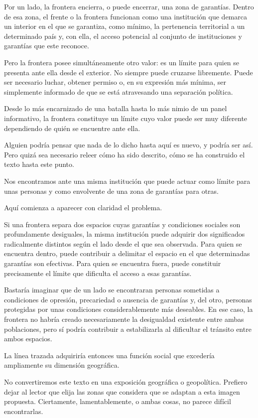 \documentclass[12pt,a4paper]{article}
\begin{document}
Por un lado, la frontera encierra, o puede encerrar, una zona de garantías. Dentro de esa zona, el frente o la frontera funcionan como una institución que demarca un interior en el que se garantiza, como mínimo, la pertenencia territorial a un determinado país y, con ella, el acceso potencial al conjunto de instituciones y garantías que este reconoce.

Pero la frontera posee simultáneamente otro valor: es un límite para quien se presenta ante ella desde el exterior. No siempre puede cruzarse libremente. Puede ser necesario luchar, obtener permiso o, en su expresión más mínima, ser simplemente informado de que se está atravesando una separación política.

Desde lo más encarnizado de una batalla hasta lo más nimio de un panel informativo, la frontera constituye un límite cuyo valor puede ser muy diferente dependiendo de quién se encuentre ante ella.

Alguien podría pensar que nada de lo dicho hasta aquí es nuevo, y podría ser así. Pero quizá sea necesario releer cómo ha sido descrito, cómo se ha construido el texto hasta este punto.

Nos encontramos ante una misma institución que puede actuar como límite para unas personas y como envolvente de una zona de garantías para otras.

Aquí comienza a aparecer con claridad el problema.

Si una frontera separa dos espacios cuyas garantías y condiciones sociales son profundamente desiguales, la misma institución puede adquirir dos significados radicalmente distintos según el lado desde el que sea observada. Para quien se encuentra dentro, puede contribuir a delimitar el espacio en el que determinadas garantías son efectivas. Para quien se encuentra fuera, puede constituir precisamente el límite que dificulta el acceso a esas garantías.

Bastaría imaginar que de un lado se encontraran personas sometidas a condiciones de opresión, precariedad o ausencia de garantías y, del otro, personas protegidas por unas condiciones considerablemente más deseables. En ese caso, la frontera no habría creado necesariamente la desigualdad existente entre ambas poblaciones, pero sí podría contribuir a estabilizarla al dificultar el tránsito entre ambos espacios.

La línea trazada adquiriría entonces una función social que excedería ampliamente su dimensión geográfica.

No convertiremos este texto en una exposición geográfica o geopolítica. Prefiero dejar al lector que elija las zonas que considera que se adaptan a esta imagen propuesta. Ciertamente, lamentablemente, o ambas cosas, no parece difícil encontrarlas.
\end{document}
